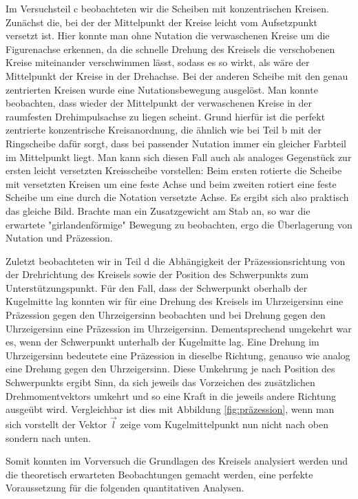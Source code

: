 \documentclass{article}
\begin{document}
Im Versuchsteil c beobachteten wir die Scheiben mit konzentrischen Kreisen. Zunächst die, bei der der Mittelpunkt der Kreise leicht vom Aufsetzpunkt versetzt ist. Hier konnte man ohne Nutation die verwaschenen Kreise um die Figurenachse erkennen, da die schnelle Drehung des Kreisels die verschobenen Kreise miteinander verschwimmen lässt, sodass es so wirkt, als wäre der Mittelpunkt der Kreise in der Drehachse. Bei der anderen Scheibe mit den genau zentrierten Kreisen wurde eine Nutationsbewegung ausgelöst. Man konnte beobachten, dass wieder der Mittelpunkt der verwaschenen Kreise in der raumfesten Drehimpulsachse zu liegen scheint. Grund hierfür ist die perfekt zentrierte konzentrische Kreisanordnung, die ähnlich wie bei Teil b mit der Ringscheibe dafür sorgt, dass bei passender Nutation immer ein gleicher Farbteil im Mittelpunkt liegt. Man kann sich diesen Fall auch als analoges Gegenstück zur ersten leicht versetzten Kreisscheibe vorstellen: Beim ersten rotierte die Scheibe mit versetzten Kreisen um eine feste Achse und beim zweiten rotiert eine feste Scheibe um eine durch die Notation versetzte Achse. Es ergibt sich also praktisch das gleiche Bild. Brachte man ein Zusatzgewicht am Stab an, so war die erwartete "girlandenförmige" Bewegung zu beobachten, ergo die Überlagerung von Nutation und Präzession.

Zuletzt beobachteten wir in Teil d die Abhängigkeit der Präzessionsrichtung von der Drehrichtung des Kreisels sowie der Position des Schwerpunkts zum Unterstützungspunkt. Für den Fall, dass der Schwerpunkt oberhalb der Kugelmitte lag konnten wir für eine Drehung des Kreisels im Uhrzeigersinn eine Präzession gegen den Uhrzeigersinn beobachten und bei Drehung gegen den Uhrzeigersinn eine Präzession im Uhrzeigersinn. Dementsprechend umgekehrt war es, wenn der Schwerpunkt unterhalb der Kugelmitte lag. Eine Drehung im Uhrzeigersinn bedeutete eine Präzession in dieselbe Richtung, genauso wie analog eine Drehung gegen den Uhrzeigersinn. Diese Umkehrung je nach Position des Schwerpunkts ergibt Sinn, da sich jeweils das Vorzeichen des zusätzlichen Drehmomentvektors umkehrt und so eine Kraft in die jeweils andere Richtung ausgeübt wird. Vergleichbar ist dies mit Abbildung \ref{fig:präzession}, wenn man sich vorstellt der Vektor $\Vec{l}$ zeige vom Kugelmittelpunkt nun nicht nach oben sondern nach unten.

Somit konnten im Vorversuch die Grundlagen des Kreisels analysiert werden und die theoretisch erwarteten Beobachtungen gemacht werden, eine perfekte Voraussetzung für die folgenden quantitativen Analysen. 
\end{document}

